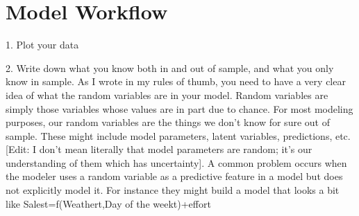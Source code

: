 \section*{Model Workflow}

1. Plot your data

2. Write down what you know both in and out of sample, and what you only know in sample.
As I wrote in my rules of thumb, you need to have a very clear idea of what the random variables are in your model. Random variables are simply those variables whose values are in part due to chance. For most modeling purposes, our random variables are the things we don’t know for sure out of sample. These might include model parameters, latent variables, predictions, etc. [Edit: I don't mean literally that model parameters are random; it's our understanding of them which has uncertainty].
A common problem occurs when the modeler uses a random variable as a predictive feature in a model but does not explicitly model it. For instance they might build a model that looks a bit like
Salest=f(Weathert,Day of the weekt)+effort

